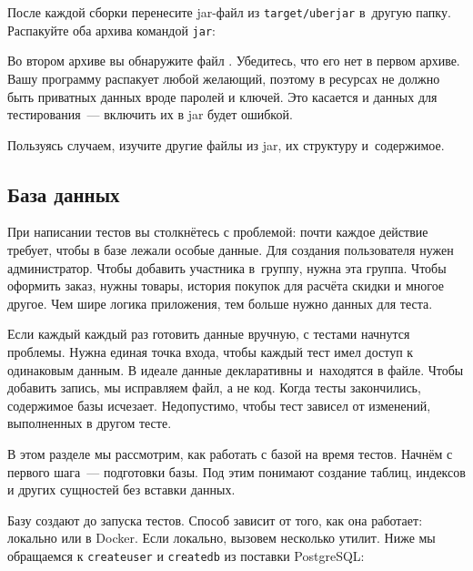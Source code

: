 \fi

После каждой сборки перенесите jar-файл из \verb|target/uberjar| в~другую
папку. Распакуйте оба архива командой \verb|jar|:

\begin{english}
\end{english}

Во втором архиве вы обнаружите файл . Убедитесь, что его
нет в первом архиве. Вашу программу распакует любой желающий, поэтому в ресурсах
не должно быть приватных данных вроде паролей и ключей. Это касается и данных
для тестирования~--- включить их в jar будет ошибкой.

Пользуясь случаем, изучите другие файлы из jar, их структуру и~содержимое.

\subsection{База данных}


При написании тестов вы столкнётесь с проблемой: почти каждое действие требует,
чтобы в базе лежали особые данные. Для создания пользователя нужен
администратор. Чтобы добавить участника в~группу, нужна эта группа. Чтобы
оформить заказ, нужны товары, история покупок для расчёта скидки и многое
другое. Чем шире логика приложения, тем больше нужно данных для теста.

Если каждый каждый раз готовить данные вручную, с тестами начнутся
проблемы. Нужна единая точка входа, чтобы каждый тест имел доступ к одинаковым
данным. В идеале данные декларативны и~находятся в файле. Чтобы добавить запись,
мы исправляем файл, а не код. Когда тесты закончились, содержимое базы
исчезает. Недопустимо, чтобы тест зависел от изменений, выполненных в другом
тесте.

В этом разделе мы рассмотрим, как работать с базой на время тестов. Начнём с
первого шага~--- подготовки базы. Под этим понимают создание таблиц, индексов и
других сущностей без вставки данных.


Базу создают до запуска тестов. Способ зависит от того, как она работает:
локально или в Docker. Если локально, вызовем несколько утилит. Ниже мы
обращаемся к \verb|createuser| и \verb|createdb| из поставки PostgreSQL:

